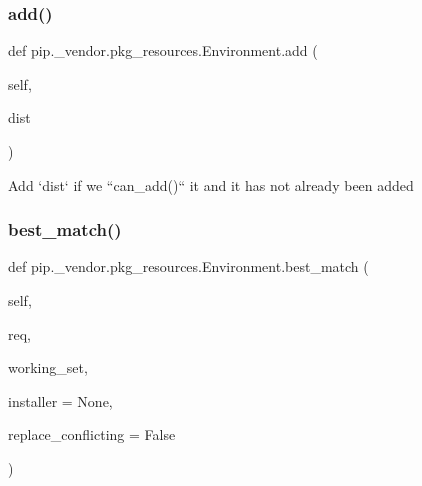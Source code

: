 \subsubsection{\texorpdfstring{add()}{add()}}
{\footnotesize\ttfamily def pip.\+\_\+vendor.\+pkg\+\_\+resources.\+Environment.\+add (\begin{DoxyParamCaption}\item[{}]{self,  }\item[{}]{dist }\end{DoxyParamCaption})}

\begin{DoxyVerb}Add `dist` if we ``can_add()`` it and it has not already been added
\end{DoxyVerb}
 \mbox{\label{classpip_1_1__vendor_1_1pkg__resources_1_1Environment_ae73299e5eb450a7149014b90332bbc9c}} 
\subsubsection{\texorpdfstring{best\+\_\+match()}{best\_match()}}
{\footnotesize\ttfamily def pip.\+\_\+vendor.\+pkg\+\_\+resources.\+Environment.\+best\+\_\+match (\begin{DoxyParamCaption}\item[{}]{self,  }\item[{}]{req,  }\item[{}]{working\+\_\+set,  }\item[{}]{installer = {\ttfamily None},  }\item[{}]{replace\+\_\+conflicting = {\ttfamily False} }\end{DoxyParamCaption})}

